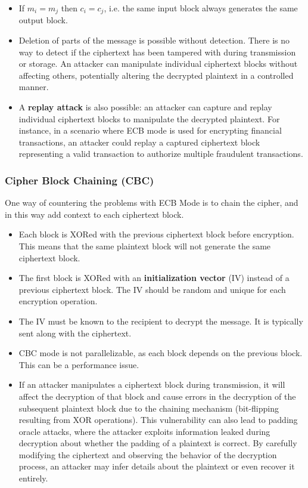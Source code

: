 \begin{itemize}
    \item If $m_i = m_j$ then $c_i = c_j$, i.e. the same input block always generates the same output block. 
    \item Deletion of parts of the message is possible without detection. There is no way to detect if the ciphertext has been tampered with during transmission or storage. An attacker can manipulate individual ciphertext blocks without affecting others, potentially altering the decrypted plaintext in a controlled manner. 
    \item A \textbf{replay attack} is also possible: an attacker can capture and replay individual ciphertext blocks to manipulate the decrypted plaintext. For instance, in a scenario where ECB mode is used for encrypting financial transactions, an attacker could replay a captured ciphertext block representing a valid transaction to authorize multiple fraudulent transactions.
\end{itemize}

\subsubsection{Cipher Block Chaining (CBC)}
One way of countering the problems with ECB Mode is to chain the cipher, and in this way add context to each ciphertext block.

\begin{itemize}
    \item Each block is XORed with the previous ciphertext block before encryption. This means that the same plaintext block will not generate the same ciphertext block.
    \item The first block is XORed with an \textbf{initialization vector} (IV) instead of a previous ciphertext block. The IV should be random and unique for each encryption operation.
    \item The IV must be known to the recipient to decrypt the message. It is typically sent along with the ciphertext.
    \item CBC mode is not parallelizable, as each block depends on the previous block. This can be a performance issue.
    \item If an attacker manipulates a ciphertext block during transmission, it will affect the decryption of that block and cause errors in the decryption of the subsequent plaintext block due to the chaining mechanism (bit-flipping resulting from XOR operations). This vulnerability can also lead to padding oracle attacks, where the attacker exploits information leaked during decryption about whether the padding of a plaintext is correct. By carefully modifying the ciphertext and observing the behavior of the decryption process, an attacker may infer details about the plaintext or even recover it entirely.
\end{itemize}

